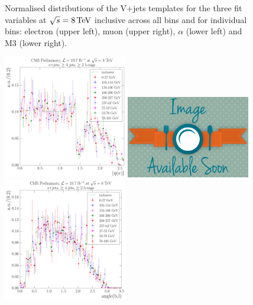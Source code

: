 \begin{figure}[hbtp]
	 \caption{Normalised distributions of the V+jets templates for the three fit variables at $\sqrt{s}=8\,\text{Te\hspace{-.08em}V}$
	 inclusive across all \mt bins and for individual \mt bins: electron \abseta (upper
	 left), muon \abseta (upper right), $\alpha$ (lower left) and M3 (lower right).}
     \label{fig:MT_fit_variable_vjets_comparisons_8TeV}
\end{figure}

\begin{figure}[hbtp]
    \centering
     \includegraphics[width=0.48\textwidth]{Chapters/04_Analysis/04b_XSections/images/8TeV/fit_variables/WPT/electron_absolute_eta/vjets/WPT_electron_absolute_eta_2orMoreBtags_VJets_template_comparison.pdf}\hfill
     \includegraphics[width=0.48\textwidth]{Chapters/04_Analysis/04b_XSections/images/placeholder.png}\\
     \includegraphics[width=0.48\textwidth]{Chapters/04_Analysis/04b_XSections/images/8TeV/fit_variables/WPT/angle_bl/vjets/WPT_angle_bl_2orMoreBtags_VJets_template_comparison.pdf}\hfill

\end{figure}
